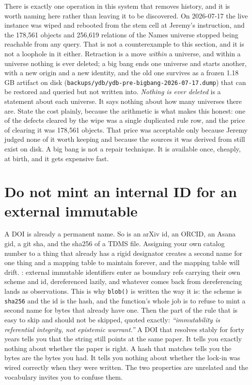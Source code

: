 There is exactly one operation in this system that removes history, and it is worth naming here rather than leaving it to be discovered. On 2026-07-17 the live instance was wiped and rebooted from the stem cell at Jeremy's instruction, and the 178{,}561 objects and 256{,}619 relations of the Names universe stopped being reachable from any query. That is not a counterexample to this section, and it is not a loophole in it either. Retraction is a move \emph{within} a universe, and within a universe nothing is ever deleted; a big bang ends one universe and starts another, with a new origin and a new identity, and the old one survives as a frozen 1.18\,GB artifact on disk (\texttt{backups/ydb/ydb-pre-bigbang-2026-07-17.dump}) that can be restored and queried but not written into. \textit{Nothing is ever deleted} is a statement about each universe. It says nothing about how many universes there are. State the cost plainly, because the arithmetic is what makes this honest: one of the defects cleared by the wipe was a single duplicated rule row, and the price of clearing it was 178{,}561 objects. That price was acceptable only because Jeremy judged none of it worth keeping and because the sources it was derived from still exist on disk. A big bang is not a repair technique. It is available once, cheaply, at birth, and it gets expensive fast.

\section{Do not mint an internal ID for an external immutable}

A DOI is already a permanent name. So is an arXiv id, an ORCID, an Asana gid, a git sha, and the sha256 of a TDMS file. Assigning your own catalog number to a thing that already has a rigid designator creates a second name for one thing and a mapping table to maintain forever, and the mapping table will drift. : external immutable identifiers enter as boundary refs carrying their own scheme and id, dereferenced lazily, and whatever comes back from dereferencing lands as observations. This is why \texttt{blob()} is written the way it is: the scheme is \texttt{sha256} and the id is the hash, and the function's whole job is to refuse to mint a second name for bytes that already have one. Then the part of the rule that is easy to skip and should not be skipped, quoted exactly: \textit{``immutability is referential integrity, not epistemic warrant.''} A DOI that resolves stably for forty years tells you that the string still points at the same paper. It tells you exactly nothing about whether the paper is right. A hash that matches tells you the bytes are the bytes you had. It tells you nothing about whether the lock-in was wired correctly when they were written. The two properties are unrelated and the vocabulary invites you to confuse them.

